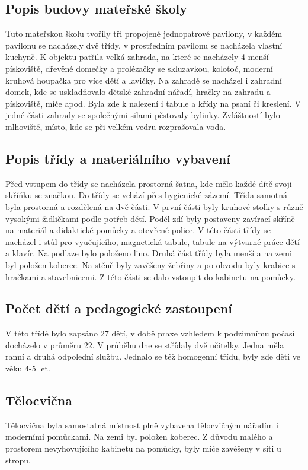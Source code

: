 		\subsection{Popis budovy mateřské školy}

			Tuto mateřskou školu tvořily tři propojené jednopatrové pavilony, v každém pavilonu se nacházely dvě třídy. v prostředním pavilonu se nacházela vlastní kuchyně. K objektu patřila velká zahrada, na které se nacházely 4 menší pískoviště, dřevěné domečky a prolézačky se skluzavkou, kolotoč, moderní kruhová houpačka pro více dětí a lavičky. Na zahradě se nacházel i zahradní domek, kde se uskladňovalo dětské zahradní nářadí, hračky na zahradu a pískoviště, míče apod. Byla zde k nalezení i tabule a křídy na psaní či kreslení. V jedné části zahrady se společnými silami pěstovaly bylinky. Zvláštností bylo mlhoviště, místo, kde se při velkém vedru rozprašovala voda. 


		\subsection{Popis třídy a materiálního vybavení}

			Před vstupem do třídy se nacházela prostorná šatna, kde mělo každé dítě svoji skříňku se značkou. Do třídy se vchází přes hygienické zázemí. Třída samotná byla prostorná a rozdělená na dvě části. V první části byly kruhové stolky s různě vysokými židličkami podle potřeb dětí. Podél zdí byly postaveny zavírací skříně na materiál a didaktické pomůcky a otevřené police. V této části třídy se nacházel i stůl pro vyučujícího, magnetická tabule, tabule na výtvarné práce dětí a klavír. Na podlaze bylo položeno lino. Druhá část třídy byla menší a na zemi byl položen koberec. Na stěně byly zavěšeny žebřiny a po obvodu byly krabice s hračkami a stavebnicemi. Z této části se dalo vstoupit do kabinetu na pomůcky.

		\subsection{Počet dětí a pedagogické zastoupení}

			V této třídě bylo zapsáno 27 dětí, v době praxe vzhledem k podzimnímu počasí docházelo v průměru 22. V průběhu dne se střídaly dvě učitelky. Jedna měla ranní a druhá odpolední službu.
			Jednalo se též  homogenní třídu, byly zde děti ve věku 4-5 let.
		
		\subsection{Tělocvična}
			Tělocvična byla samostatná místnost plně vybavena tělocvičným nářadím i moderními pomůckami. Na zemi byl položen koberec. Z důvodu malého a prostorem nevyhovujícího kabinetu na pomůcky,  byly míče zavěšeny v síti u stropu.

